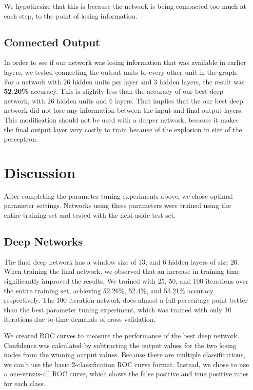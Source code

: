 \documentclass[letterpaper,twocolumn,12pt]{article}
\begin{document}
We hypothesize that this is because the network is being compacted too much at each step, to the point of losing information.

\subsection{Connected Output}
In order to see if our network was losing information that was available in earlier layers, we tested connecting the output units to every other unit in the graph.
For a network with 26 hidden units per layer and 3 hidden layers, the result was \textbf{52.20\%} accuracy.
This is slightly less than the accuracy of our best deep network, with 26 hidden units and 6 layers.
That implies that the our best deep network did not lose any information between the input and final output layers.
This modification should not be used with a deeper network, because it makes the final output layer very costly to train because of the explosion in size of the perceptron.


\section{Discussion}
After completing the parameter tuning experiments above, we chose optimal parameter settings.
Networks using these parameters were trained using the entire training set and tested with the held-aside test set.

\subsection{Deep Networks}
The final deep network has a window size of 13, and 6 hidden layers of size 26.
When training the final network, we observed that an increase in training time significantly improved the results. 
We trained with 25, 50, and 100 iterations over the entire training set, achieving 52.26\%, 52.4\%, and 53.21\% accuracy respectively.
The 100 iteration network does almost a full percentage point better than the best parameter tuning experiment, which was trained with only 10 iterations due to time demands of cross validation.

We created ROC curves to measure the performance of the best deep network.
Confidence was calculated by subtracting the output values for the two losing nodes from the winning output values.
Because there are multiple classifications, we can't use the basic 2-classification ROC curve format.
Instead, we chose to use a one-versus-all ROC curve, which shows the false positive and true positive rates for each class.
\end{document}
